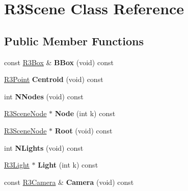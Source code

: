 \hypertarget{class_r3_scene}{}\section{R3\+Scene Class Reference}
\label{class_r3_scene}
\subsection*{Public Member Functions}
\begin{DoxyCompactItemize}
\item 
const \hyperlink{class_r3_box}{R3\+Box} \& {\bfseries B\+Box} (void) const \hypertarget{class_r3_scene_aa06b8cab65814cf8ab0a978567d22c1a}{}\label{class_r3_scene_aa06b8cab65814cf8ab0a978567d22c1a}

\item 
\hyperlink{class_r3_point}{R3\+Point} {\bfseries Centroid} (void) const \hypertarget{class_r3_scene_a028fa5f4dd8c9caf02e5dd30a930d861}{}\label{class_r3_scene_a028fa5f4dd8c9caf02e5dd30a930d861}

\item 
int {\bfseries N\+Nodes} (void) const \hypertarget{class_r3_scene_a747b59acd24a85e2e47245b245afa24c}{}\label{class_r3_scene_a747b59acd24a85e2e47245b245afa24c}

\item 
\hyperlink{class_r3_scene_node}{R3\+Scene\+Node} $\ast$ {\bfseries Node} (int k) const \hypertarget{class_r3_scene_a194d1200076c2d67b1ba5bb8cdae77aa}{}\label{class_r3_scene_a194d1200076c2d67b1ba5bb8cdae77aa}

\item 
\hyperlink{class_r3_scene_node}{R3\+Scene\+Node} $\ast$ {\bfseries Root} (void) const \hypertarget{class_r3_scene_ae3065e7f7ca0837aa097bd1342f7b8ba}{}\label{class_r3_scene_ae3065e7f7ca0837aa097bd1342f7b8ba}

\item 
int {\bfseries N\+Lights} (void) const \hypertarget{class_r3_scene_aea2ac387c17c77f952e07b2760c92454}{}\label{class_r3_scene_aea2ac387c17c77f952e07b2760c92454}

\item 
\hyperlink{class_r3_light}{R3\+Light} $\ast$ {\bfseries Light} (int k) const \hypertarget{class_r3_scene_ade268a4566941d202a103a5e80e57d09}{}\label{class_r3_scene_ade268a4566941d202a103a5e80e57d09}

\item 
const \hyperlink{class_r3_camera}{R3\+Camera} \& {\bfseries Camera} (void) const \hypertarget{class_r3_scene_a9031c48830efa7685128d45f2d7a89e4}{}\label{class_r3_scene_a9031c48830efa7685128d45f2d7a89e4}


\end{DoxyCompactItemize}
